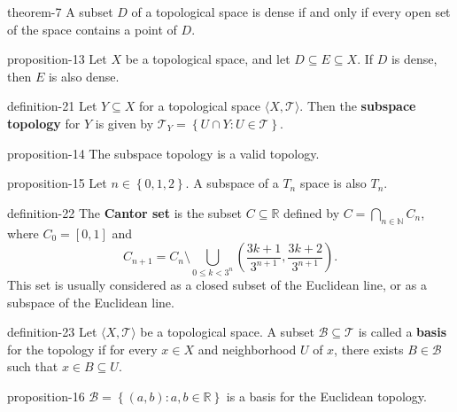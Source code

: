 \documentclass[10pt,]{article}
\newcommand{\terminology}[1]{\textbf{#1}}
\newcommand{\tuple}[1]{\langle #1 \rangle}
\newcommand{\mb}{\mathbb}
\newcommand{\mc}{\mathcal}
\newcommand{\setBuilder}[2]{\left\{#1:#2\right\}}
\newcommand{\setList}[1]{\left\{#1\right\}}
\newcommand{\lt}{<}
\begin{document}
\begin{theorem}{}{}{theorem-7}%
\hypertarget{p-67}{}%
A subset \(D\) of a topological space is dense if and only if every open set of the space contains a point of \(D\).%
\end{theorem}
\begin{proposition}{}{}{proposition-13}%
\hypertarget{p-68}{}%
Let \(X\) be a topological space, and let \(D\subseteq E\subseteq X\). If \(D\) is dense, then \(E\) is also dense.%
\end{proposition}
\begin{definition}{}{definition-21}%
\hypertarget{p-69}{}%
Let \(Y\subseteq X\) for a topological space \(\tuple{X,\mc T}\). Then the \terminology{subspace topology} for \(Y\) is given by \(\mc T_Y=\setBuilder{U\cap Y}{U\in\mc T}\).%
\end{definition}
\begin{proposition}{}{}{proposition-14}%
\hypertarget{p-70}{}%
The subspace topology is a valid topology.%
\end{proposition}
\begin{proposition}{}{}{proposition-15}%
\hypertarget{p-71}{}%
Let \(n\in\setList{0,1,2}\). A subspace of a \(T_n\) space is also \(T_n\).%
\end{proposition}
\begin{definition}{}{definition-22}%
\hypertarget{p-72}{}%
The \terminology{Cantor set} is the subset \(C\subseteq\mb R\) defined by \(C=\bigcap_{n\in\mb N} C_n\), where \(C_0=[0,1]\) and%
\begin{equation*}
C_{n+1}=C_n\setminus\bigcup_{0\leq k\lt 3^n} 
\left(\frac{3k+1}{3^{n+1}},\frac{3k+2}{3^{n+1}}\right).
\end{equation*}
This set is usually considered as a closed subset of the Euclidean line, or as a subspace of the Euclidean line.%
\end{definition}
\begin{definition}{}{definition-23}%
\hypertarget{p-73}{}%
Let \(\tuple{X,\mc T}\) be a topological space. A subset \(\mc B\subseteq\mc T\) is called a \terminology{basis} for the topology if for every \(x\in X\) and neighborhood \(U\) of \(x\), there exists \(B\in\mc B\) such that \(x\in B\subseteq U\).%
\end{definition}
\begin{proposition}{}{}{proposition-16}%
\hypertarget{p-74}{}%
\(\mc B=\setBuilder{(a,b)}{a,b\in\mb R}\) is a basis for the Euclidean topology.%
\end{proposition}
\end{document}
